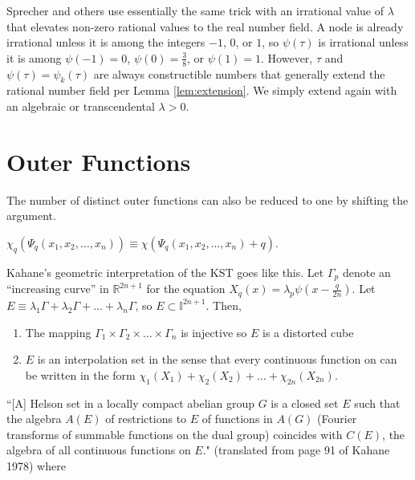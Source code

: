 Sprecher and others use essentially the same trick with an irrational value of $\lambda$ that elevates non-zero rational values to the real number field. A node is already irrational unless it is among the integers $-1$, $0$, or $1$, so $\psi\left(\tau\right)$ is irrational unless it is among $\psi\left(-1\right) = 0$, $\psi\left(0\right) = \frac{3}{8}$, or $\psi\left(1\right) = 1$. However, $\tau$ and $\psi\left(\tau\right) = \psi_k\left(\tau\right)$ are always constructible numbers that generally extend the rational number field per Lemma \ref{lem:extension}. We simply extend again with an algebraic or transcendental $\lambda > 0$.

\chapter{Outer Functions}\label{ch:OuterFunctions}

The number of distinct outer functions can also be reduced to one by shifting the argument.
\begin{definition}
  \label{def:outer}
  $\chi_q\left(\Psi_q\left(x_1, x_2, \dots, x_n\right)\right) \equiv \chi\left(\Psi_q\left(x_1, x_2, \dots, x_n\right) + q\right)$.
\end{definition}

Kahane's geometric interpretation of the KST goes like this. Let $\Gamma_p$ denote an ``increasing curve'' in $\mathbb{R}^{2n + 1}$ for the equation $X_q\left(x\right) = \lambda_p \psi\left(x - \frac{q}{2n}\right)$. Let $E \equiv \lambda_1 \Gamma + \lambda_2 \Gamma + \dots + \lambda_n \Gamma$, so $E \subset \mathbb{I}^{2n + 1}$. Then,
\begin{enumerate}
  \item The mapping $\Gamma_1 \times \Gamma_2 \times \dots \times \Gamma_n$ is injective so $E$ is a distorted cube
  \item $E$ is an interpolation set in the sense that every continuous function on can be written in the form $\chi_1\left(X_1\right) + \chi_2\left(X_2\right) + \dots + \chi_{2n}\left(X_{2n}\right)$.
\end{enumerate}

\begin{definition}
  \label{def:Helson_set}
``[A] Helson set in a locally compact abelian group $G$ is a closed set $E$ such that the algebra $A(E)$ of restrictions to $E$ of functions in $A(G)$ (Fourier transforms of summable functions on the dual group) coincides with $C(E)$, the algebra of all continuous functions on $E$." (translated from page 91 of Kahane 1978) where 
\end{definition}

